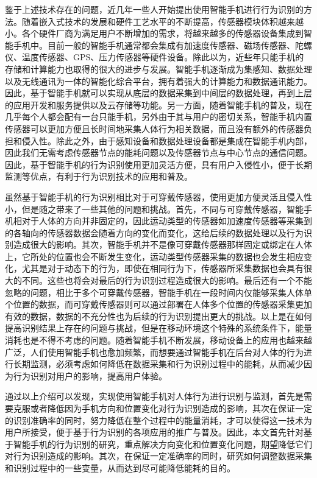 \par 鉴于上述技术存在的问题，近几年一些人开始提出使用智能手机进行行为识别的方法。随着嵌入式技术的发展和硬件工艺水平的不断提高，传感器模块体积越来越小。各个硬件厂商为满足用户不断增加的需求，将越来越多的传感器设备集成到智能手机中。目前一般的智能手机通常都会集成有加速度传感器、磁场传感器、陀螺仪、温度传感器、GPS、压力传感器等硬件设备\cite{smartphoneSensor}。除此以为，近些年只能手机的存储和计算能力也取得的很大的进步与发展。智能手机逐渐成为集感知、数据处理以及无线通讯为一体的智能化综合平台，拥有着强大的计算能力和数据通讯能力。因此，基于智能手机就可以实现从底层的数据采集到中间层的数据处理，再到上层的应用开发和服务提供以及云存储等功能。另一方面，随着智能手机的普及，现在几乎每个人都会配有一台只能手机，另外由于其与用户的密切关系，智能手机内置传感器可以更加方便且长时间地采集人体行为相关数据，而且没有额外的传感器负担和侵入性。除此之外，由于感知设备和数据处理设备都是集成在智能手机内部，因此我们无需考虑传感器节点的能耗问题以及传感器节点与中心节点的通信问题。因此，基于智能手机的行为识别使用更加灵活方便，具有用户入侵性小，便于长期监测等优点，有利于行为识别技术的应用和普及。
\par 虽然基于智能手机的行为识别相比对于可穿戴传感器，使用更加方便灵活且侵入性小，但是随之带来了一些其他的问题和挑战。首先，不同与可穿戴传感器，智能手机相对于人体的方向并非固定的，因此运动类型的传感器如加速度传感器等采集到的各轴向的传感器数据会随着方向的变化而变化，这给后续的数据处理以及行为识别造成很大的影响。其次，智能手机并不是像可穿戴传感器那样固定或绑定在人体上，它所处的位置也会不断发生变化，运动类型传感器采集的数据也会发生相应变化，尤其是对于动态下的行为，即使在相同行为下，传感器所采集数据也会具有很大的不同。这些也将会对最后的行为识别过程造成很大的影响。最后还有一个不能忽略的问题，相比于多个可穿戴传感器，智能手机在一段时间内仅能够采集人体单个位置的数据，而可穿戴传感器则可以通过部署在人体多个位置的传感器采集更加有效的数据，数据的不充分性也为后续的行为识别提出更大的挑战。以上是在如何提高识别结果上存在的问题与挑战，但是在移动环境这个特殊的系统条件下，能量消耗也是不得不考虑的问题。随着智能手机不断发展，移动设备上的应用也越来越广泛，人们使用智能手机也愈加频繁，而想要通过智能手机在后台对人体的行为进行长期监测，必须考虑如何降低在数据采集和行为识别过程中的能耗，从而减少因为行为识别对用户的影响，提高用户体验。
\par 通过以上介绍可以发现，实现使用智能手机对人体行为进行识别与监测，首先是需要克服或者降低因为手机方向和位置变化对行为识别造成的影响，其次在保证一定的识别准确率的同时，努力降低在整个过程中的能量消耗，才可以使得这一技术为用户所接受，便于基于行为识别的各项应用的推广与普及。因此，本文首先针对基于智能手机的行为识别的研究，重点解决方向变化和位置变化问题，期望降低它们对行为识别造成的影响。其次，在保证一定准确率的同时，研究如何调整数据采集和识别过程中的一些变量，从而达到尽可能降低能耗的目的。

